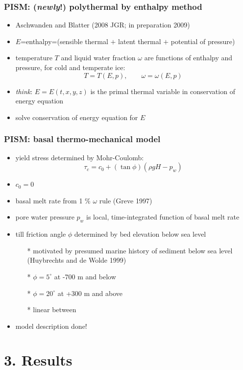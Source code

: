 \documentclass{beamer}
\begin{document}
\begin{frame}
  \frametitle{PISM: (\textsl{newly}!) polythermal by enthalpy method}

\begin{itemize}
\item Aschwanden and Blatter (2008 JGR; in preparation 2009)
\item $E$=enthalpy=(sensible thermal $+$ latent thermal $+$ potential of pressure)
\item temperature $T$ and liquid water fraction $\omega$ are functions of enthalpy and pressure, for cold and temperate ice: 
  $$T=T(E,p), \qquad \omega=\omega(E,p)$$
\item \emph{think}: $E=E(t,x,y,z)$ is the primal thermal variable in conservation of energy equation
\item solve conservation of energy equation for $E$
\end{itemize}

\end{frame}


\begin{frame}
  \frametitle{PISM: basal thermo-mechanical model}

\begin{itemize}
\item yield stress determined by Mohr-Coulomb:
	$$\tau_c = c_0 + (\tan \phi)\left(\rho g H - p_w\right)$$
\item $c_0=0$
\item basal melt rate from 1 \% $\omega$ rule (Greve 1997)
\item pore water pressure $p_w$ is local, time-integrated function of basal melt rate
\item till friction angle $\phi$ determined by bed elevation below sea level
  \begin{itemize}
  \item[*] motivated by presumed marine history of sediment below sea level (Huybrechts and de Wolde 1999)
  \item[*] $\phi=5^\circ$ at -700 m and below
  \item[*] $\phi=20^\circ$ at +300 m and above
  \item[*] linear between
  \end{itemize}
\item \alert{model description done!}
\end{itemize}
\end{frame}



\section{3. Results}\subsection*{}
\end{document}
